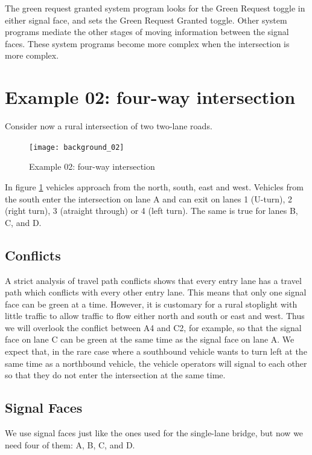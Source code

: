 \documentclass[letterpaper,twoside]{article}
\begin{document}
The green request granted system program looks for the Green Request
toggle in either signal face, and sets the Green Request Granted
toggle.  Other system programs mediate the other stages of moving
information between the signal faces.  These system programs become
more complex when the intersection is more complex.

\section{Example 02: four-way intersection}

Consider now a rural intersection of two two-lane roads.

\begin{figure}[htb]
  {\texttt{[image: background\_02]}}
  {\caption{Example 02: four-way intersection}
    \label{fig:four-way_intersection}}
\end{figure}

In figure \ref{fig:four-way_intersection} vehicles approach from the
north, south, east and west.  Vehicles from the south enter the intersection
on lane A and can exit on lanes 1 (U-turn), 2 (right turn), 3 (atraight
through) or 4 (left turn).  The same is true for lanes B, C, and D.

\subsection{Conflicts}

A strict analysis of travel path conflicts shows that every entry lane
has a travel path which conflicts with every other entry lane.  This means
that only one signal face can be green at a time.
However, it is customary for a rural stoplight with little traffic to allow
traffic to flow either north and south or east and west.  
Thus we will overlook the conflict between A4 and C2, for example, so
that the signal face on lane C can be green at the same time as the
signal face on lane A.  We expect that, in the rare case where a southbound
vehicle wants to turn left at the same time as a northbound vehicle,
the vehicle operators will signal to each other so that they do not
enter the intersection at the same time.

\subsection{Signal Faces}

We use signal faces just like the ones used for the single-lane
bridge, but now we need four of them: A, B, C, and D.
\end{document}
